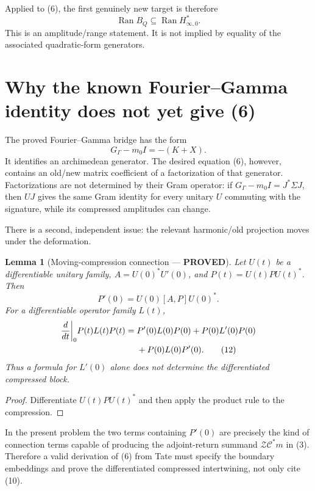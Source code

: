 \documentclass[11pt]{article}
\newtheorem{lemma}[theorem]{Lemma}
\newcommand{\PROVED}{\textcolor{green!45!black}{\textbf{PROVED}}}
\newcommand{\Ran}{\operatorname{Ran}}
\newcommand{\cC}{\mathscr C}
\newcommand{\cZ}{\mathscr Z}
\begin{document}
Applied to (6), the first genuinely new target is therefore
\begin{equation}
 \boxed{\Ran B_Q\subseteq\Ran H_{\infty,0}^*.}           \tag{9}
\end{equation}
This is an amplitude/range statement.  It is not implied by equality of the
associated quadratic-form generators.

\section{Why the known Fourier--Gamma identity does not yet give (6)}

The proved Fourier--Gamma bridge has the form
\begin{equation}
 G_\Gamma-m_0I=-(K+X).                                  \tag{10}
\end{equation}
It identifies an archimedean generator.  The desired equation (6), however,
contains an old/new matrix coefficient of a factorization of that generator.
Factorizations are not determined by their Gram operator: if
$G_\Gamma-m_0I=J^*\Sigma J$, then $UJ$ gives the same Gram identity for every
unitary $U$ commuting with the signature, while its compressed amplitudes can
change.

There is a second, independent issue: the relevant harmonic/old projection
moves under the deformation.

\begin{lemma}[Moving-compression connection --- \PROVED]
Let $U(t)$ be a differentiable unitary family, $A=U(0)^*U'(0)$, and
$P(t)=U(t)P U(t)^*$.  Then
\begin{equation}
 P'(0)=U(0)[A,P]U(0)^*.                                  \tag{11}
\end{equation}
For a differentiable operator family $L(t)$,
\begin{align}
 \frac d{dt}\bigg|_0 P(t)L(t)P(t)
  ={}&P'(0)L(0)P(0)+P(0)L'(0)P(0)\notag\\
    &+P(0)L(0)P'(0).                                    \tag{12}
\end{align}
Thus a formula for $L'(0)$ alone does not determine the differentiated
compressed block.
\end{lemma}

\begin{proof}
Differentiate $U(t)PU(t)^*$ and then apply the product rule to the compression.
\end{proof}

In the present problem the two terms containing $P'(0)$ are precisely the
kind of connection terms capable of producing the adjoint-return summand
$\cZ\cC^*m$ in (3).  Therefore a valid derivation of (6) from Tate must specify
the boundary embeddings and prove the differentiated compressed intertwining,
not only cite (10).
\end{document}
